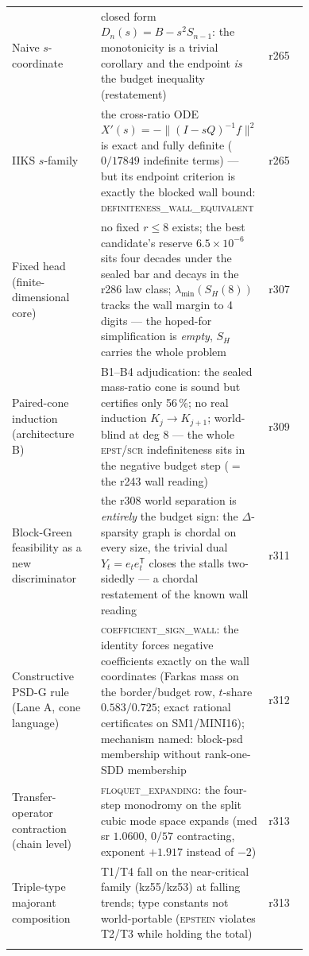 \documentclass[11pt]{article}
\theoremstyle{definition}
\theoremstyle{remark}
\begin{document}
\begin{center}
\begin{tabular}{@{}p{0.30\linewidth}p{0.44\linewidth}l@{}}
\addlinespace[2pt]
Naive $s$-coordinate & closed form $D_n(s)=B-s^2S_{n-1}$: the monotonicity
is a trivial corollary and the endpoint \emph{is} the budget inequality
(restatement) & r265\\
\addlinespace[2pt]
IIKS $s$-family & the cross-ratio ODE
$X'(s)=-\|(I-sQ)^{-1}f\|^2$ is exact and fully definite ($0/17849$
indefinite terms) --- but its endpoint criterion is exactly the blocked
wall bound: \textsc{definiteness\_wall\_equivalent} & r265\\
\addlinespace[2pt]
Fixed head (finite-dimensional core) & no fixed $r\le8$ exists; the
best candidate's reserve $6.5\times10^{-6}$ sits four decades under
the sealed bar and decays in the r286 law class; $\lambda_{\min}(S_H(8))$
tracks the wall margin to 4 digits --- the hoped-for simplification is
\emph{empty}, $S_H$ carries the whole problem & r307\\
\addlinespace[2pt]
Paired-cone induction (architecture B) & B1--B4 adjudication: the
sealed mass-ratio cone is sound but certifies only 56\,\%; no real
induction $K_j\to K_{j+1}$; world-blind at deg 8 --- the whole
\textsc{epst}/\textsc{scr} indefiniteness sits in the negative budget
step ($=$ the r243 wall reading) & r309\\
\addlinespace[2pt]
Block-Green feasibility as a new discriminator & the r308 world
separation is \emph{entirely} the budget sign: the $\Delta$-sparsity
graph is chordal on every size, the trivial dual $Y_t=e_te_t^{\mathsf T}$
closes the stalls two-sidedly --- a chordal restatement of the known
wall reading & r311\\
\addlinespace[2pt]
Constructive PSD-G rule (Lane A, cone language) &
\textsc{coefficient\_sign\_wall}: the identity forces negative
coefficients exactly on the wall coordinates (Farkas mass on the
border/budget row, $t$-share $0.583/0.725$; exact rational
certificates on SM1/MINI16); mechanism named: block-psd membership
without rank-one-SDD membership & r312\\
\addlinespace[2pt]
Transfer-operator contraction (chain level) &
\textsc{floquet\_expanding}: the four-step monodromy on the split
cubic mode space expands (med sr $1.0600$, $0/57$ contracting,
exponent $+1.917$ instead of $-2$) & r313\\
\addlinespace[2pt]
Triple-type majorant composition & T1/T4 fall on the near-critical
family (kz55/kz53) at falling trends; type constants not
world-portable (\textsc{epstein} violates T2/T3 while holding the
total) & r313\\
\addlinespace[2pt]

\end{tabular}
\end{center}
\end{document}
